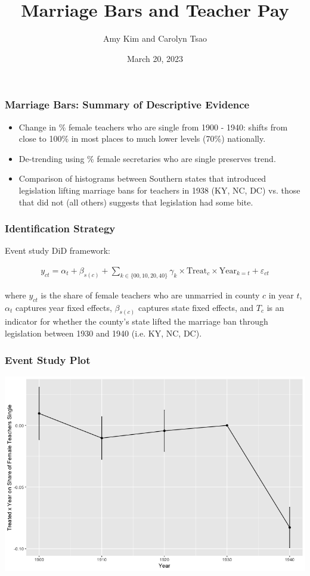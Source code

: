 \documentclass[xcolor=dvipsnames, compress]{beamer}
\title{Marriage Bars and Teacher Pay}
\author{Amy Kim and Carolyn Tsao}
\date{March 20, 2023}
\begin{document}
\begin{frame}[plain]
    \titlepage
\end{frame}

\begin{frame}
    \frametitle{Marriage Bars: Summary of Descriptive Evidence}
        \begin{itemize}
            \item Change in \% female teachers who are single from 1900 - 1940: shifts from close to 100\% in most places to much lower levels (70\%) nationally.
            \item De-trending using \% female secretaries who are single preserves trend.
            \item Comparison of histograms between Southern states that introduced legislation lifting marriage bans for teachers in 1938 (KY, NC, DC) vs. those that did not (all others) suggests that legislation had some bite.
        \end{itemize}
\end{frame}

\begin{frame}
    \frametitle{Identification Strategy}
    Event study DiD framework:    

        \begin{eqnarray}
        y_{ct} = \alpha_t + \beta_{s(c)} + \sum_{k \in \{00, 10, 20, 40\}} \gamma_k \times \text{Treat}_c \times \text{Year}_{k=t} + \varepsilon_{ct}
        \end{eqnarray}
        
        where $y_{ct}$ is the share of female teachers who are unmarried in county $c$ in year $t$, $\alpha_t$ captures year fixed effects, $\beta_{s(c)}$ captures state fixed effects, and $T_c$ is an indicator for whether the county's state lifted the marriage ban through legislation between 1930 and 1940 (i.e. KY, NC, DC).
        
\end{frame}

\begin{frame}
    \frametitle{Event Study Plot}
    \includegraphics[width=\textwidth]{../figures/did_plot.png}
\end{frame}
\end{document}
